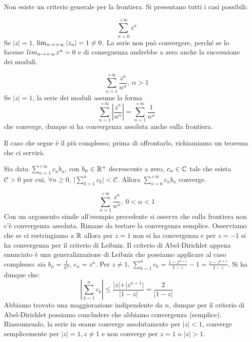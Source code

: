 \documentclass[Completo.tex]{subfiles}
\begin{document}
Non esiste un criterio generale per la frontiera. Si presentano tutti i casi possibili:
\begin{Ex}
	\begin{equation*}
	\sum\limits_{n=0}^{+\infty} z^n
	\end{equation*}
Se $\vert z \vert = 1$, $\lim_{n \rightarrow +\infty} \vert z_n \vert = 1 \neq 0$. La serie non può convergere, perché se lo facesse $lim_{n \rightarrow +\infty} z^n = 0$ e di conseguenza andrebbe a zero anche la successione dei moduli.
\end{Ex}
\begin{Ex}
	\begin{equation*}
	\sum\limits_{n=1}^{+\infty} \frac{z^n}{n^{\alpha}}, \ \alpha > 1
	\end{equation*}
	Se $\vert z \vert = 1$, la serie dei moduli assume la forma
	\begin{equation*}
		\sum\limits_{n=1}^{+\infty} \left\vert \frac{z^n}{n^{\alpha}} \right\vert = 	\sum\limits_{n=1}^{+\infty} \frac{1}{n^{\alpha}}
	\end{equation*}
	che converge, dunque si ha convergenza assoluta anche sulla frontiera.
\end{Ex}
Il caso che segue è il più complesso; prima di affrontarlo, richiamiamo un teorema che ci servirà.
\begin{Th}
	Sia data $\sum_{n=1}^{+\infty} c_n b_n$, con $b_n \in \bb[R]^+$ decrescente a zero, $c_n \in \bb[C]$ tale che esista $\mathcal{C} > 0$ per cui, $\forall n \geq 0$, $\vert\sum_{k = 1}^{n}  c_k\vert  < \mathcal{C}$. Allora $\sum_{n=0}^{+\infty} c_n b_n$ converge.\end{Th}
\begin{Ex}
	\begin{equation*}
		\sum\limits_{n=1}^{+\infty} \frac{z^n}{n^{\alpha}}, \ 0 < \alpha < 1
	\end{equation*}
	Con un argomento simile all'esempio precedente si osserva che sulla frontiera non c'è convergenza assoluta. Rimane da testare la convergenza semplice. Osserviamo che se ci restringiamo a $\bb[R]$ allora per $z = 1$ non si ha convergenza e per $z = -1$ si ha convergenza per il criterio di Leibniz. Il criterio di Abel-Dirichlet appena enunciato è una generalizzazione di Leibniz che possiamo applicare al caso complesso: sia $b_n = \frac{1}{n^{\alpha}}$, $c_n = z^n$. Per $z \neq 1$, $\sum_{k = 1}^{n} c_k = \frac{1-z^{n+1}}{1-z} -1 = \frac{z-z^{n+1}}{1-z}$. Si ha dunque che:
	\begin{equation*}
	\left\vert \sum_{k = 1}^{n} c_k \right\vert \leq \frac{\vert z \vert + \vert z^{n+1} \vert}{\vert 1-z \vert} = \frac{2}{\vert 1-z \vert}
	\end{equation*}
	Abbiamo trovato una maggiorazione indipendente da $n$, dunque per il criterio di Abel-Dirichlet possiamo concludere che abbiamo convergenza (semplice). \\
	Riassumendo, la serie in esame converge assolutamente per $\vert z \vert < 1$, converge semplicemente per $\vert z \vert = 1, z \neq 1$ e non converge per $z = 1$ o $\vert z \vert > 1$.
\end{Ex}
\end{document}
